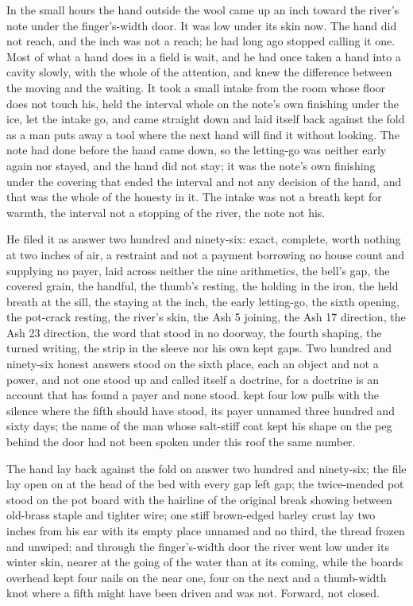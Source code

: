 In the small hours the hand outside the wool came up an inch toward the river's note under the finger's-width door. It was low under its skin now. The hand did not reach, and the inch was not a reach; he had long ago stopped calling it one. Most of what a hand does in a field is wait, and he had once taken a hand into a cavity slowly, with the whole of the attention, and knew the difference between the moving and the waiting. It took a small intake from the room whose floor does not touch his, held the interval whole on the note's own finishing under the ice, let the intake go, and came straight down and laid itself back against the fold as a man puts away a tool where the next hand will find it without looking. The note had done before the hand came down, so the letting-go was neither early again nor stayed, and the hand did not stay; it was the note's own finishing under the covering that ended the interval and not any decision of the hand, and that was the whole of the honesty in it. The intake was not a breath kept for warmth, the interval not a stopping of the river, the note not his.

He filed it as answer two hundred and ninety-six: exact, complete, worth nothing at two inches of air, a restraint and not a payment borrowing no house count and supplying no payer, laid across neither the nine arithmetics, the bell's gap, the covered grain, the handful, the thumb's resting, the holding in the iron, the held breath at the sill, the staying at the inch, the early letting-go, the sixth opening, the pot-crack resting, the river's skin, the Ash 5 joining, the Ash 17 direction, the Ash 23 direction, the word that stood in no doorway, the fourth shaping, the turned writing, the strip in the sleeve nor his own kept gaps. Two hundred and ninety-six honest answers stood on the sixth place, each an object and not a power, and not one stood up and called itself a doctrine, for a doctrine is an account that has found a payer and none stood.  kept four low pulls with the silence where the fifth should have stood, its payer unnamed three hundred and sixty days; the name of the man whose salt-stiff coat kept his shape on the peg behind the door had not been spoken under this roof the same number.

The hand lay back against the fold on answer two hundred and ninety-six; the file lay open on  at the head of the bed with every gap left gap; the twice-mended pot stood on the pot board with the hairline of the original break showing between old-brass staple and tighter wire; one stiff brown-edged barley crust lay two inches from his ear with its empty place unnamed and no third, the thread frozen and unwiped; and through the finger's-width door the river went low under its winter skin, nearer at the going of the water than at its coming, while the boards overhead kept four nails on the near one, four on the next and a thumb-width knot where a fifth might have been driven and was not. Forward, not closed.
